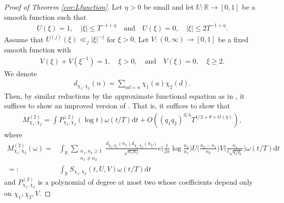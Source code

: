 \documentclass[12pt]{amsart}
\theoremstyle{definition}
\theoremstyle{remark}
\numberwithin{equation}{section}
\newcommand{\R}{{\mathbb R}}
\newcommand{\1}{{\mathbf 1}}
\renewcommand{\d}{\mathrm d}
\begin{document}
\begin{proof}[Proof of Theorem \ref{cor:Lfunction}]
Let $\eta>0$ be small and let $U:\R \to [0,1]$ be a smooth function such that
\begin{align*}
    U(\xi) = 1, \quad |\xi| \leq T^{-1+\eta} \quad \text{and} \quad  U(\xi) = 0, \quad |\xi| \leq 2T^{-1+\eta}.
\end{align*}
Assume that $U^{(j)}(\xi) \ll_j |\xi|^{-j}$ for $\xi > 0$.
Let $V:(0,\infty) \to [0,1]$ be a fixed smooth function with
\begin{align*}
    V(\xi) + V(\xi^{-1}) = 1, \quad \xi >0, \quad \text{and} \quad V(\xi) = 0, \quad \xi \geq 2.
\end{align*}
We denote
 \begin{align*}
          d_{\chi_1,\chi_2}(n)=\sum_{ad=n}\chi_1(a)\chi_2(d).
      \end{align*}
      Then,
      by similar reductions by the approximate functional equation as in \cite[Section 5]{berke}, it suffices to show an improved version of \cite[Proposition 5.5]{berke}. 
      That is, it suffices to show that 
\begin{align}\label{eq:M2asymp}
    M^{(2)}_{\chi_1,\chi_2}=\int P^{(2)}_{\chi_1,\chi_2}(\log t)\omega(t/T) \d t+O((q_1q_2)^{3/4}T^{1/2+\theta+O(\eta)}),
\end{align}
where 
\begin{align*}
    M^{(2)}_{\chi_1,\chi_2}(\omega) = &\int_\R \sum_{\substack{n_1,n_2 \geq 1 \\ n_1 \neq n_2} } \frac{d_{\chi_1,\chi_2}(n_1) d_{\overline{\chi_1},\overline{\chi_2}}(n_2)}{\sqrt{n_1n_2}} e\bigg( \frac{t}{2 \pi } \log \frac{n_2}{n_1}\bigg) U\bigg(\frac{n_2-n_1}{n_2}\bigg) V\bigg(\frac{n_1 }{ t \sqrt{q_1q_2} } \bigg) \omega(t/T) \d t \\
    =: &\int_\R S_{\chi_1,\chi_2} (t,U,V) \omega(t/T) \d t
\end{align*}
and $P^{(2)}_{\chi_1,\chi_2}$ is a polynomial of degree at most two whose coefficients depend only on $\chi_1,\chi_2,V$.


\end{proof}
\end{document}
